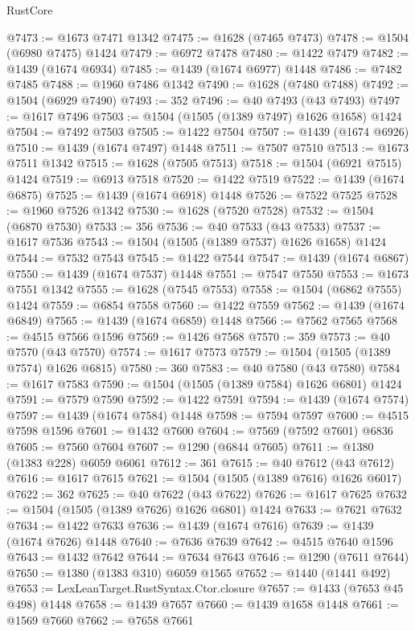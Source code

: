 \begin{lexlean}{RustCore}
\begin{coremodule}
@7473 := @1673 @7471 @1342
@7475 := @1628 (@7465 @7473)
@7478 := @1504 (@6980 @7475) @1424
@7479 := @6972 @7478
@7480 := @1422 @7479
@7482 := @1439 (@1674 @6934)
@7485 := @1439 (@1674 @6977) @1448
@7486 := @7482 @7485
@7488 := @1960 @7486 @1342
@7490 := @1628 (@7480 @7488)
@7492 := @1504 (@6929 @7490)
@7493 := 352
@7496 := @40 @7493 (@43 @7493)
@7497 := @1617 @7496
@7503 := @1504 (@1505 (@1389 @7497) @1626 @1658) @1424
@7504 := @7492 @7503
@7505 := @1422 @7504
@7507 := @1439 (@1674 @6926)
@7510 := @1439 (@1674 @7497) @1448
@7511 := @7507 @7510
@7513 := @1673 @7511 @1342
@7515 := @1628 (@7505 @7513)
@7518 := @1504 (@6921 @7515) @1424
@7519 := @6913 @7518
@7520 := @1422 @7519
@7522 := @1439 (@1674 @6875)
@7525 := @1439 (@1674 @6918) @1448
@7526 := @7522 @7525
@7528 := @1960 @7526 @1342
@7530 := @1628 (@7520 @7528)
@7532 := @1504 (@6870 @7530)
@7533 := 356
@7536 := @40 @7533 (@43 @7533)
@7537 := @1617 @7536
@7543 := @1504 (@1505 (@1389 @7537) @1626 @1658) @1424
@7544 := @7532 @7543
@7545 := @1422 @7544
@7547 := @1439 (@1674 @6867)
@7550 := @1439 (@1674 @7537) @1448
@7551 := @7547 @7550
@7553 := @1673 @7551 @1342
@7555 := @1628 (@7545 @7553)
@7558 := @1504 (@6862 @7555) @1424
@7559 := @6854 @7558
@7560 := @1422 @7559
@7562 := @1439 (@1674 @6849)
@7565 := @1439 (@1674 @6859) @1448
@7566 := @7562 @7565
@7568 := @4515 @7566 @1596
@7569 := @1426 @7568
@7570 := 359
@7573 := @40 @7570 (@43 @7570)
@7574 := @1617 @7573
@7579 := @1504 (@1505 (@1389 @7574) @1626 @6815)
@7580 := 360
@7583 := @40 @7580 (@43 @7580)
@7584 := @1617 @7583
@7590 := @1504 (@1505 (@1389 @7584) @1626 @6801) @1424
@7591 := @7579 @7590
@7592 := @1422 @7591
@7594 := @1439 (@1674 @7574)
@7597 := @1439 (@1674 @7584) @1448
@7598 := @7594 @7597
@7600 := @4515 @7598 @1596
@7601 := @1432 @7600
@7604 := @7569 (@7592 @7601) @6836
@7605 := @7560 @7604
@7607 := @1290 (@6844 @7605)
@7611 := @1380 (@1383 @228) @6059 @6061
@7612 := 361
@7615 := @40 @7612 (@43 @7612)
@7616 := @1617 @7615
@7621 := @1504 (@1505 (@1389 @7616) @1626 @6017)
@7622 := 362
@7625 := @40 @7622 (@43 @7622)
@7626 := @1617 @7625
@7632 := @1504 (@1505 (@1389 @7626) @1626 @6801) @1424
@7633 := @7621 @7632
@7634 := @1422 @7633
@7636 := @1439 (@1674 @7616)
@7639 := @1439 (@1674 @7626) @1448
@7640 := @7636 @7639
@7642 := @4515 @7640 @1596
@7643 := @1432 @7642
@7644 := @7634 @7643
@7646 := @1290 (@7611 @7644)
@7650 := @1380 (@1383 @310) @6059 @1565
@7652 := @1440 (@1441 @492)
@7653 := LexLeanTarget.RustSyntax.Ctor.closure
@7657 := @1433 (@7653 @45 @498) @1448
@7658 := @1439 @7657
@7660 := @1439 @1658 @1448
@7661 := @1569 @7660
@7662 := @7658 @7661

\end{coremodule}
\end{lexlean}
